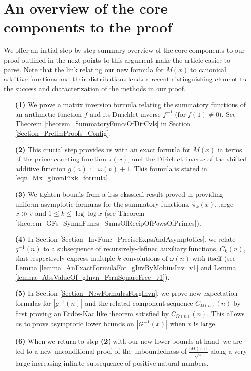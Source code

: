 \documentclass[11pt,reqno,a4letter]{article}
\numberwithin{figure}{section}
\numberwithin{table}{section}
\theoremstyle{plain}
\numberwithin{theorem}{section}
\theoremstyle{definition}
\begin{document}
\newpage
\section{An overview of the core components to the proof} 

We offer an initial step-by-step summary overview of the core components 
to our proof outlined in the next points to this argument make the 
article easier to parse. 
Note that the link relating our new formula for $M(x)$ 
to canonical additive functions and their 
distributions lends a recent distinguishing element to the 
success and characterization of the methods in our proof. 

\begin{itemize} 

\item[\textbf{(1)}] We prove a matrix inversion formula relating the summatory 
           functions of an arithmetic function $f$ and its Dirichlet inverse $f^{-1}$ (for $f(1) \neq 0$). 
           See Theorem \ref{theorem_SummatoryFuncsOfDirCvls} in 
           Section \ref{Section_PrelimProofs_Config}.  
\item[\textbf{(2)}] This crucial step provides us with an exact formula for $M(x)$ in terms of 
           the prime counting function $\pi(x)$, and the 
           Dirichlet inverse of the shifted additive function $g(n) := \omega(n) + 1$. This 
           formula is stated in \eqref{eqn_Mx_gInvnPixk_formula}. 
\item[\textbf{(3)}] We tighten bounds from a less classical result proved in 
            \cite[\S 7]{MV} providing uniform asymptotic formulas for the  
           summatory functions, $\widehat{\pi}_k(x)$, large $x \gg e$ and 
           $1 \leq k \leq \log\log x$ 
           (see Theorem \ref{theorem_GFs_SymmFuncs_SumsOfRecipOfPowsOfPrimes}). 
\item[\textbf{(4)}] In 
           Section \ref{Section_InvFunc_PreciseExpsAndAsymptotics}. 
           we relate $g^{-1}(n)$ to a subsequence of recursively-defined auxiliary functions, $C_k(n)$, 
           that respectively express multiple $k$-convolutions of $\omega(n)$ with itself 
           (see Lemma \ref{lemma_AnExactFormulaFor_gInvByMobiusInv_v1} and 
           Lemma \ref{lemma_AbsValueOf_gInvn_FornSquareFree_v1}). 
\item[\textbf{(5)}] In Section \ref{Section_NewFormulasForgInvn}, 
           we prove new expectation formulas for $|g^{-1}(n)|$ and the related component sequence 
           $C_{\Omega(n)}(n)$ by first proving an Erd\"os-Kac like theorem satisfied by $C_{\Omega(n)}(n)$. 
           This allows us to prove asymptotic lower bounds on $|G^{-1}(x)|$ when $x$ is large. 
\item[\textbf{(6)}] When we return to step \textbf{(2)} 
           with our new lower bounds at hand, we are led to a new unconditional proof of the 
           unboundedness of $\frac{|M(x)|}{\sqrt{x}}$ 
           along a very large increasing infinite subsequence of positive natural numbers. 
           
\end{itemize} 
\end{document}
